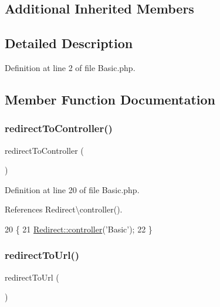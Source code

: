 \subsection*{Additional Inherited Members}


\subsection{Detailed Description}


Definition at line 2 of file Basic.\+php.



\subsection{Member Function Documentation}
\hypertarget{class_basic_a53f01fc4c43d1cecc497d9645f920407}{}\label{class_basic_a53f01fc4c43d1cecc497d9645f920407} 
\subsubsection{\texorpdfstring{redirect\+To\+Controller()}{redirectToController()}}
{\footnotesize\ttfamily redirect\+To\+Controller (\begin{DoxyParamCaption}{ }\end{DoxyParamCaption})}



Definition at line 20 of file Basic.\+php.



References Redirect\textbackslash{}controller().


\begin{DoxyCode}
20                                            \{
21         \hyperlink{class_redirect_ab7d0d268b6aaa9a5470b7cb8c7eb1b61}{Redirect::controller}(\textcolor{stringliteral}{'Basic'});
22     \}
\end{DoxyCode}
\hypertarget{class_basic_abf786273f796a96f5532dc60f9cec813}{}\label{class_basic_abf786273f796a96f5532dc60f9cec813} 
\subsubsection{\texorpdfstring{redirect\+To\+Url()}{redirectToUrl()}}
{\footnotesize\ttfamily redirect\+To\+Url (\begin{DoxyParamCaption}{ }\end{DoxyParamCaption})}



